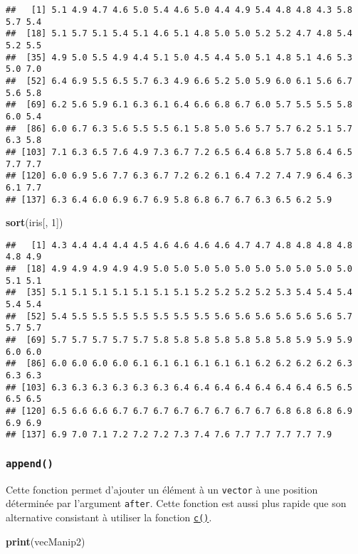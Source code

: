 \documentclass[]{book}
\newenvironment{Shaded}{\begin{snugshade}}{\end{snugshade}}
\newcommand{\KeywordTok}[1]{\textcolor[rgb]{0.13,0.29,0.53}{\textbf{#1}}}
\newcommand{\DecValTok}[1]{\textcolor[rgb]{0.00,0.00,0.81}{#1}}
\newcommand{\NormalTok}[1]{#1}
\theoremstyle{definition}
\theoremstyle{definition}
\theoremstyle{definition}
\theoremstyle{remark}
\begin{document}
\begin{verbatim}
##   [1] 5.1 4.9 4.7 4.6 5.0 5.4 4.6 5.0 4.4 4.9 5.4 4.8 4.8 4.3 5.8 5.7 5.4
##  [18] 5.1 5.7 5.1 5.4 5.1 4.6 5.1 4.8 5.0 5.0 5.2 5.2 4.7 4.8 5.4 5.2 5.5
##  [35] 4.9 5.0 5.5 4.9 4.4 5.1 5.0 4.5 4.4 5.0 5.1 4.8 5.1 4.6 5.3 5.0 7.0
##  [52] 6.4 6.9 5.5 6.5 5.7 6.3 4.9 6.6 5.2 5.0 5.9 6.0 6.1 5.6 6.7 5.6 5.8
##  [69] 6.2 5.6 5.9 6.1 6.3 6.1 6.4 6.6 6.8 6.7 6.0 5.7 5.5 5.5 5.8 6.0 5.4
##  [86] 6.0 6.7 6.3 5.6 5.5 5.5 6.1 5.8 5.0 5.6 5.7 5.7 6.2 5.1 5.7 6.3 5.8
## [103] 7.1 6.3 6.5 7.6 4.9 7.3 6.7 7.2 6.5 6.4 6.8 5.7 5.8 6.4 6.5 7.7 7.7
## [120] 6.0 6.9 5.6 7.7 6.3 6.7 7.2 6.2 6.1 6.4 7.2 7.4 7.9 6.4 6.3 6.1 7.7
## [137] 6.3 6.4 6.0 6.9 6.7 6.9 5.8 6.8 6.7 6.7 6.3 6.5 6.2 5.9
\end{verbatim}

\begin{Shaded}
\begin{Highlighting}[]
\KeywordTok{sort}\NormalTok{(iris[, }\DecValTok{1}\NormalTok{])}
\end{Highlighting}
\end{Shaded}

\begin{verbatim}
##   [1] 4.3 4.4 4.4 4.4 4.5 4.6 4.6 4.6 4.6 4.7 4.7 4.8 4.8 4.8 4.8 4.8 4.9
##  [18] 4.9 4.9 4.9 4.9 4.9 5.0 5.0 5.0 5.0 5.0 5.0 5.0 5.0 5.0 5.0 5.1 5.1
##  [35] 5.1 5.1 5.1 5.1 5.1 5.1 5.1 5.2 5.2 5.2 5.2 5.3 5.4 5.4 5.4 5.4 5.4
##  [52] 5.4 5.5 5.5 5.5 5.5 5.5 5.5 5.5 5.6 5.6 5.6 5.6 5.6 5.6 5.7 5.7 5.7
##  [69] 5.7 5.7 5.7 5.7 5.7 5.8 5.8 5.8 5.8 5.8 5.8 5.8 5.9 5.9 5.9 6.0 6.0
##  [86] 6.0 6.0 6.0 6.0 6.1 6.1 6.1 6.1 6.1 6.1 6.2 6.2 6.2 6.2 6.3 6.3 6.3
## [103] 6.3 6.3 6.3 6.3 6.3 6.3 6.4 6.4 6.4 6.4 6.4 6.4 6.4 6.5 6.5 6.5 6.5
## [120] 6.5 6.6 6.6 6.7 6.7 6.7 6.7 6.7 6.7 6.7 6.7 6.8 6.8 6.8 6.9 6.9 6.9
## [137] 6.9 7.0 7.1 7.2 7.2 7.2 7.3 7.4 7.6 7.7 7.7 7.7 7.7 7.9
\end{verbatim}

\subsubsection{\texorpdfstring{\texttt{append()}}{append()}}\label{l015append}

Cette fonction permet d'ajouter un élément à un \texttt{vector} à une
position déterminée par l'argument \texttt{after}. Cette fonction est
aussi plus rapide que son alternative consistant à utiliser la fonction
\protect\hyperlink{l014vector}{\texttt{c()}}.

\begin{Shaded}
\begin{Highlighting}[]
\KeywordTok{print}\NormalTok{(vecManip2)}
\end{Highlighting}
\end{Shaded}
\end{document}
